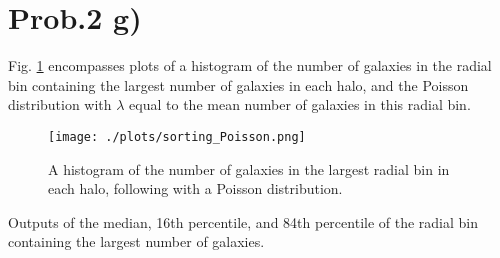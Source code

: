 \section{Prob.2 g)}

Fig. \ref{fig:fig6} encompasses plots of a histogram of the number of galaxies in the radial bin containing the largest number of galaxies in each halo, and the Poisson distribution with $\lambda$ equal to the mean number of galaxies in this radial bin.



\begin{figure}[ht!]
  \centering
  \texttt{[image: ./plots/sorting\_Poisson.png]}
  \caption{A histogram of the number of galaxies in the largest radial bin in each halo, following with a Poisson distribution.}
  \label{fig:fig6}
\end{figure}

Outputs of the median, 16th percentile, and 84th percentile of the radial bin containing the largest number of galaxies. 

